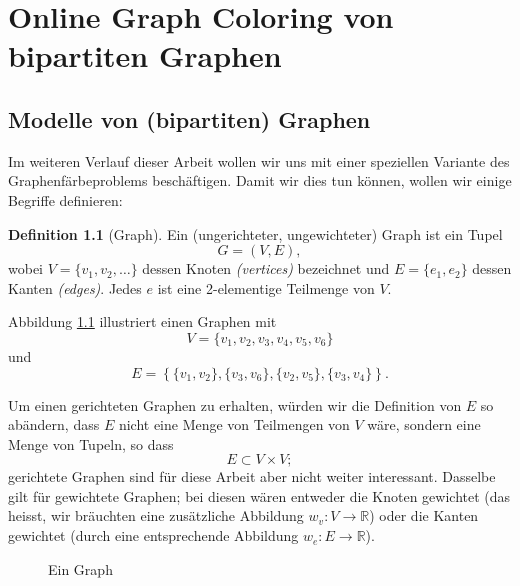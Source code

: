 \documentclass[11pt]{scrreprt} %
\theoremstyle{definition}
\newtheorem{definition}{Definition}
\begin{document}
\chapter{Online Graph Coloring von bipartiten Graphen}

\section{Modelle von (bipartiten) Graphen}

Im weiteren Verlauf dieser Arbeit wollen wir uns mit einer speziellen Variante des Graphenfärbeproblems beschäftigen. Damit wir dies tun können, wollen wir einige Begriffe definieren:

\begin{definition}[Graph]

Ein (ungerichteter, ungewichteter) Graph ist ein Tupel
\[
	G = (V, E),
\]
wobei $V = \{v_1, v_2, \dots \}$ dessen Knoten {\sl (vertices)} bezeichnet und $E = \{ e_1, e_2 \}$ dessen Kanten {\sl (edges)}. Jedes $e$ ist eine 2-elementige Teilmenge von $V$. \cite{biggs}

\end{definition}

Abbildung \ref{graph} illustriert einen Graphen mit
\[
	V = \{v_1,v_2,v_3,v_4,v_5,v_6\}
\]
und
\[
	E = \left\{  \{v_1,v_2\}, \{v_3,v_6\}, \{v_2,v_5\}, \{v_3,v_4\}  \right\}.
\]

\bigskip
Um einen gerichteten Graphen zu erhalten, würden wir die Definition von $E$ so abändern, dass $E$ nicht eine Menge von Teilmengen von $V$ wäre, sondern eine Menge von Tupeln, so dass
\[
E \subset V \times V;
\]
gerichtete Graphen sind für diese Arbeit aber nicht weiter interessant. Dasselbe gilt für gewichtete Graphen; bei diesen wären entweder die Knoten gewichtet (das heisst, wir bräuchten eine zusätzliche Abbildung $w_v : V \rightarrow \mathbb{R}$) oder die Kanten gewichtet (durch eine entsprechende Abbildung $w_e : E \rightarrow \mathbb{R}$).

\begin{figure}
\caption{Ein Graph}
\label{graph}
\begin{center}


\end{center}
\end{figure}
\end{document}
